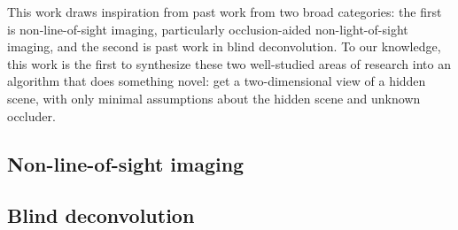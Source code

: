 This work draws inspiration from past work from two broad categories: the first is non-line-of-sight imaging, particularly occlusion-aided non-light-of-sight imaging, and the second is past work in blind deconvolution. To our knowledge, this work is the first to synthesize these two well-studied areas of research into an algorithm that does something novel: get a two-dimensional view of a hidden scene, with only minimal assumptions about the hidden scene and unknown occluder.

\subsection{Non-line-of-sight imaging}

\subsection{Blind deconvolution}

